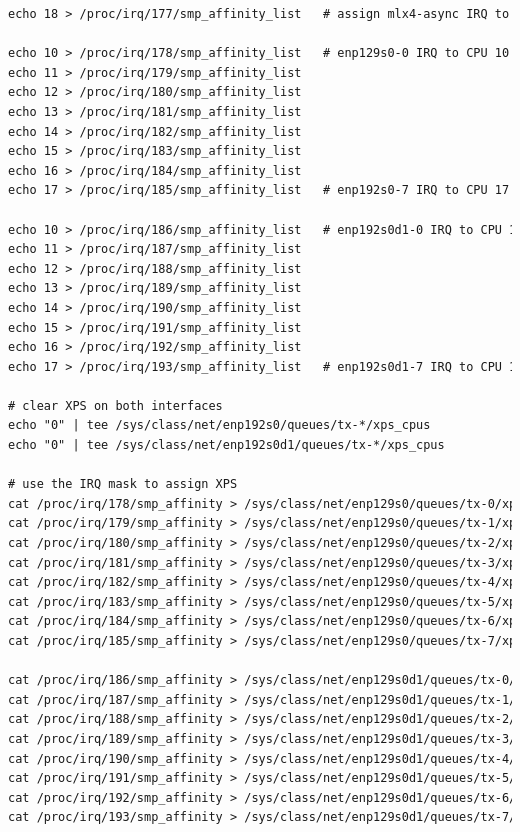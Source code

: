 \begin{lstlisting}[language=TeX]
echo 18 > /proc/irq/177/smp_affinity_list   # assign mlx4-async IRQ to CPU 18

echo 10 > /proc/irq/178/smp_affinity_list   # enp129s0-0 IRQ to CPU 10
echo 11 > /proc/irq/179/smp_affinity_list
echo 12 > /proc/irq/180/smp_affinity_list
echo 13 > /proc/irq/181/smp_affinity_list
echo 14 > /proc/irq/182/smp_affinity_list
echo 15 > /proc/irq/183/smp_affinity_list
echo 16 > /proc/irq/184/smp_affinity_list
echo 17 > /proc/irq/185/smp_affinity_list   # enp192s0-7 IRQ to CPU 17

echo 10 > /proc/irq/186/smp_affinity_list   # enp192s0d1-0 IRQ to CPU 10
echo 11 > /proc/irq/187/smp_affinity_list
echo 12 > /proc/irq/188/smp_affinity_list
echo 13 > /proc/irq/189/smp_affinity_list
echo 14 > /proc/irq/190/smp_affinity_list
echo 15 > /proc/irq/191/smp_affinity_list
echo 16 > /proc/irq/192/smp_affinity_list
echo 17 > /proc/irq/193/smp_affinity_list   # enp192s0d1-7 IRQ to CPU 17

# clear XPS on both interfaces
echo "0" | tee /sys/class/net/enp192s0/queues/tx-*/xps_cpus
echo "0" | tee /sys/class/net/enp192s0d1/queues/tx-*/xps_cpus

# use the IRQ mask to assign XPS
cat /proc/irq/178/smp_affinity > /sys/class/net/enp129s0/queues/tx-0/xps_cpus
cat /proc/irq/179/smp_affinity > /sys/class/net/enp129s0/queues/tx-1/xps_cpus
cat /proc/irq/180/smp_affinity > /sys/class/net/enp129s0/queues/tx-2/xps_cpus
cat /proc/irq/181/smp_affinity > /sys/class/net/enp129s0/queues/tx-3/xps_cpus
cat /proc/irq/182/smp_affinity > /sys/class/net/enp129s0/queues/tx-4/xps_cpus
cat /proc/irq/183/smp_affinity > /sys/class/net/enp129s0/queues/tx-5/xps_cpus
cat /proc/irq/184/smp_affinity > /sys/class/net/enp129s0/queues/tx-6/xps_cpus
cat /proc/irq/185/smp_affinity > /sys/class/net/enp129s0/queues/tx-7/xps_cpus

cat /proc/irq/186/smp_affinity > /sys/class/net/enp129s0d1/queues/tx-0/xps_cpus
cat /proc/irq/187/smp_affinity > /sys/class/net/enp129s0d1/queues/tx-1/xps_cpus
cat /proc/irq/188/smp_affinity > /sys/class/net/enp129s0d1/queues/tx-2/xps_cpus
cat /proc/irq/189/smp_affinity > /sys/class/net/enp129s0d1/queues/tx-3/xps_cpus
cat /proc/irq/190/smp_affinity > /sys/class/net/enp129s0d1/queues/tx-4/xps_cpus
cat /proc/irq/191/smp_affinity > /sys/class/net/enp129s0d1/queues/tx-5/xps_cpus
cat /proc/irq/192/smp_affinity > /sys/class/net/enp129s0d1/queues/tx-6/xps_cpus
cat /proc/irq/193/smp_affinity > /sys/class/net/enp129s0d1/queues/tx-7/xps_cpus
\end{lstlisting}
